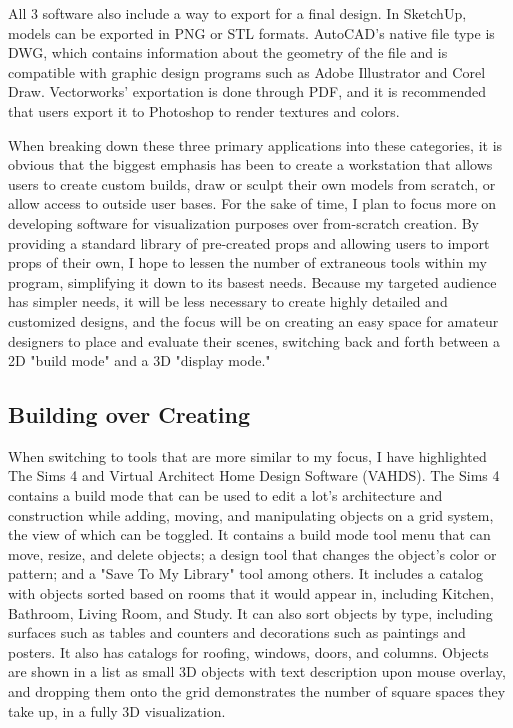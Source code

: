 \documentclass[10pt,twocolumn]{article}
\begin{document}
All 3 software also include a way to export for a final design. In SketchUp, models can be exported in PNG or STL formats. AutoCAD's native file type is DWG, which contains information about the geometry of the file and is compatible with graphic design programs such as Adobe Illustrator and Corel Draw. Vectorworks' exportation is done through PDF, and it is recommended that users export it to Photoshop to render textures and colors. 

When breaking down these three primary applications into these categories, it is obvious that the biggest emphasis has been to create a workstation that allows users to create custom builds, draw or sculpt their own models from scratch, or allow access to outside user bases. For the sake of time, I plan to focus more on developing software for visualization purposes over from-scratch creation. By providing a standard library of pre-created props and allowing users to import props of their own, I hope to lessen the number of extraneous tools within my program, simplifying it down to its basest needs. Because my targeted audience has simpler needs, it will be less necessary to create highly detailed and customized designs, and the focus will be on creating an easy space for amateur designers to place and evaluate their scenes, switching back and forth between a 2D "build mode" and a 3D "display mode."

\subsection{Building over Creating}
When switching to tools that are more similar to my focus, I have highlighted The Sims 4 and Virtual Architect Home Design Software (VAHDS). The Sims 4 contains a build mode that can be used to edit a lot's architecture and construction while adding, moving, and manipulating objects on a grid system, the view of which can be toggled. It contains a build mode tool menu that can move, resize, and delete objects; a design tool that changes the object's color or pattern; and a "Save To My Library" tool among others. It includes a catalog with objects sorted based on rooms that it would appear in, including Kitchen, Bathroom, Living Room, and Study. It can also sort objects by type, including surfaces such as tables and counters and decorations such as paintings and posters. It also has catalogs for roofing, windows, doors, and columns. Objects are shown in a list as small 3D objects with text description upon mouse overlay, and dropping them onto the grid demonstrates the number of square spaces they take up, in a fully 3D visualization. 
\end{document}
